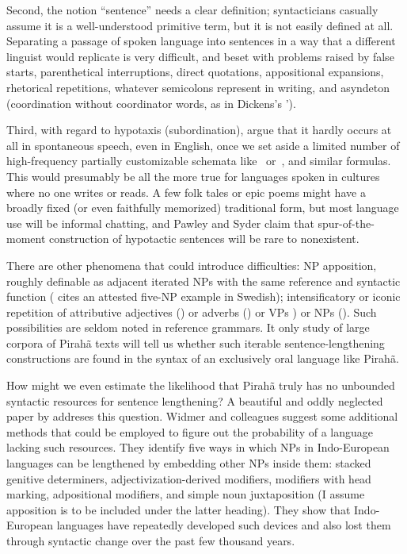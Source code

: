 \documentclass[output=paper,colorlinks,citecolor=brown
]{langscibook}
\begin{document}
Second, the notion ``sentence'' needs a clear definition; syntacticians
casually assume it is a well-understood primitive term, but it is not
easily defined at all. Separating a passage of spoken language into
sentences in a way that a different linguist would replicate is very
difficult, and beset with problems raised by false starts,
parenthetical interruptions, direct quotations, appositional
expansions, rhetorical repetitions, whatever semicolons represent in
writing, and asyndeton (coordination without coordinator words, as
in Dickens's ').

Third, with regard to hypotaxis (subordination), \citet{PawlSyde00}
argue that it hardly occurs at all in spontaneous speech, even in
English, once we set aside a limited number of high-frequency partially
customizable schemata like \, or \,, and similar formulas. This would presumably be all
the more true for languages spoken in cultures where no one writes
or reads. A few folk tales or epic poems might have a broadly fixed
(or even faithfully memorized) traditional form, but most language
use will be informal chatting, and Pawley and Syder claim that
spur-of-the-moment construction of hypotactic sentences will be rare
to nonexistent.

There are other phenomena that could introduce difficulties: NP
apposition, roughly definable as adjacent iterated NPs with the same
reference and syntactic function (\citealt{Karlsson10} cites an
attested five-NP example in Swedish); intensificatory or iconic
repetition of attributive adjectives ()
or adverbs () or VPs ) or NPs (). Such possibilities are seldom noted
in reference grammars. It only study of large corpora of Pirah{\~a}
texts will tell us whether such iterable sentence-lengthening
constructions are found in the syntax of an exclusively oral language
like Pirah{\~a}.

How might we even estimate the likelihood that Pirah{\~a} truly has no
unbounded syntactic resources for sentence lengthening? A beautiful
and oddly neglected paper by \citet{WidmerEtAl17} addreses this
question. Widmer and colleagues suggest some additional methods that
could be employed to figure out the probability of a language lacking
such resources. They identify five ways in which NPs in Indo-European
languages can be lengthened by embedding other NPs inside them: stacked
genitive determiners, adjectivization-derived modifiers, modifiers
with head marking, adpositional modifiers, and simple noun
juxtaposition (I assume apposition is to be included under the latter
heading). They show that Indo-European languages have repeatedly
developed such devices and also lost them through syntactic change
over the past few thousand years.
\end{document}
